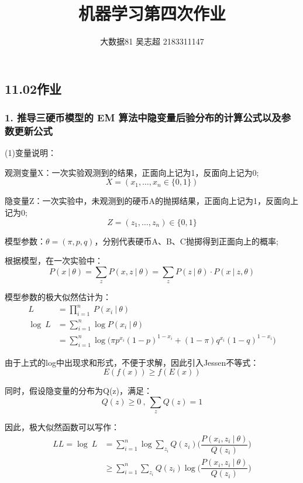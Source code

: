 \documentclass[12pt,a4paper]{article}
\title{机器学习第四次作业}
\author{大数据81 吴志超 2183311147}
\begin{document}
\begin{spacing}{1.3}
\section*{11.02作业}
\subsubsection*{1. 推导三硬币模型的 EM 算法中隐变量后验分布的计算公式以及参数更新公式}
\par \noindent (1)变量说明：
\par 观测变量X：一次实验观测到的结果，正面向上记为1，反面向上记为0;
$$X=(x_{1},\dots,x_{n} \in \{0,1\})$$ 
\par 隐变量Z：一次实验中，未观测到的硬币A的抛掷结果，正面向上记为1，反面向上记为0;
$$Z=(z_{1},\dots,z_{n}) \in \{0,1\} $$
\par 模型参数：$\theta=(\pi,p,q)$，分别代表硬币A、B、C抛掷得到正面向上的概率;
\\
\par 根据模型，在一次实验中：
$$P(x\ |\ \theta) = \sum\limits_{z} P(x,z\ |\ \theta) = \sum\limits_{z} P(z\ |\ \theta)·P(x\ |\ z,\theta) $$
\par 模型参数的极大似然估计为：
\begin{equation}
    \begin{split}
        L &= \prod\limits_{i=1}^{n} \ P(x_{i} \ | \ \theta) \\
        \log \ L &=\sum\limits_{i=1}^{n} \log P(x_{i} \ | \ \theta) \\
        &=\sum\limits_{i=1}^{n} \log \biggl(\pi p^{x_{i}}(1-p)^{1-x_{i}}+(1-\pi)q^{x_{i}}(1-q)^{1-x_{i}} \biggl) 
    \nonumber
    \end{split}
\end{equation}
\par 由于上式的log中出现求和形式，不便于求解，因此引入Jessen不等式：
$$E(f(x)) \ge f(E(x)) $$
\par 同时，假设隐变量的分布为Q(z)，满足：
$$Q(z)\ge 0 \ , \ \sum\limits_{z} Q(z) =1$$
\par 因此，极大似然函数可以写作：
\begin{equation}
    \begin{split}
        LL = \log \ L &=\sum\limits_{i=1}^{n}\log \sum\limits_{z_{i}}Q(z_{i})
        \biggl(\dfrac{P(x_{i},z_{i}\ | \ \theta)}{Q(z_{i})} \biggr)  \\
        &\ge \sum\limits_{i=1}^{n}\sum\limits_{z_{i}}Q(z_{i}) 
        \log \biggl(\dfrac{P(x_{i},z_{i}\ | \ \theta)}{Q(z_{i})} \biggr) \\ 

\end{split}
\end{equation}
\end{spacing}
\end{document}
